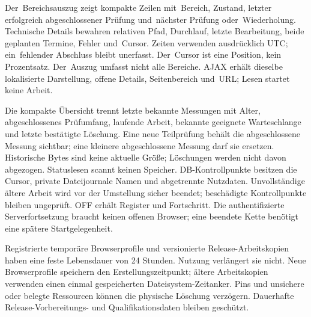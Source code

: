 \documentclass[11pt,a4paper]{article}
\begin{document}
Der~Bereichsauszug zeigt kompakte Zeilen mit~Bereich, Zustand, letzter
erfolgreich abgeschlossener Prüfung und~nächster Prüfung oder~Wiederholung.
Technische Details bewahren relativen Pfad, Durchlauf, letzte Bearbeitung, beide
geplanten Termine, Fehler und~Cursor. Zeiten verwenden ausdrücklich UTC;
ein~fehlender Abschluss bleibt unerfasst. Der~Cursor ist eine Position, kein
Prozentsatz. Der~Auszug umfasst nicht alle Bereiche. AJAX erhält dieselbe
lokalisierte Darstellung, offene Details, Seitenbereich und~URL; Lesen startet
keine Arbeit.

Die kompakte Übersicht trennt letzte bekannte Messungen mit Alter,
abgeschlossenes Prüfumfang, laufende Arbeit, bekannte geeignete Warteschlange
und letzte bestätigte Löschung. Eine neue Teilprüfung behält die abgeschlossene
Messung sichtbar; eine kleinere abgeschlossene Messung darf sie ersetzen.
Historische Bytes sind keine aktuelle Größe; Löschungen werden nicht davon
abgezogen. Statuslesen scannt keinen Speicher. DB-Kontrollpunkte besitzen die
Cursor, private Dateijournale Namen und abgetrennte Nutzdaten. Unvollständige
ältere Arbeit wird vor der Umstellung sicher beendet; beschädigte Kontrollpunkte
bleiben ungeprüft. OFF erhält Register und Fortschritt. Die authentifizierte
Serverfortsetzung braucht keinen offenen Browser; eine beendete Kette benötigt
eine spätere Startgelegenheit.

Registrierte temporäre Browserprofile und versionierte Release-Arbeitskopien
haben eine feste Lebensdauer von 24 Stunden. Nutzung verlängert sie nicht.
Neue Browserprofile speichern den Erstellungszeitpunkt; ältere Arbeitskopien
verwenden einen einmal gespeicherten Dateisystem-Zeitanker. Pins und unsichere
oder belegte Ressourcen können die physische Löschung verzögern. Dauerhafte
Release-Vorbereitungs- und Qualifikationsdaten bleiben geschützt.
\end{document}
